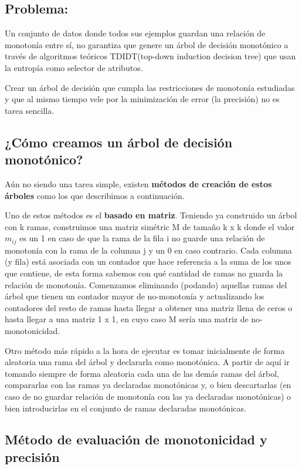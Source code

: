 \subsection{Problema:}
Un conjunto de datos donde todos sus ejemplos guardan una relación de monotonía entre sí, no garantiza que genere un árbol de decisión monotónico a través de algoritmos teóricos TDIDT(top-down induction decision tree) que usan la entropía como selector de atributos.

Crear un árbol de decisión que cumpla las restricciones de monotonía estudiadas y que al mismo tiempo vele por la minimización de error (la precisión) no es tarea sencilla. 

\subsection{¿Cómo creamos un árbol de decisión monotónico?}

Aún no siendo una tarea simple, existen \textbf{métodos de creación de estos árboles} como los que describimos a continuación.

Uno de estos métodos es el \textbf{basado en matriz}. Teniendo ya construido un árbol con k ramas, construimos una matriz simétric M de tamaño k x k donde el valor $m_{ij}$ es un 1 en caso de que la rama de la fila i no guarde una relación de monotonía con la rama de la columna j y un 0 en caso contrario. Cada columna (y fila) está asociada con un contador que hace referencia a la suma de los unos que contiene, de esta forma sabemos con qué cantidad de ramas no guarda la relación de monotonía. Comenzamos eliminando (podando) aquellas ramas del árbol que tienen un contador mayor de no-monotonía y actualizando los contadores del resto de ramas hasta llegar a obtener una matriz llena de ceros o hasta llegar a una matriz 1 x 1, en cuyo caso M sería una matriz de no-monotonicidad.

Otro método más rápido a la hora de ejecutar es tomar inicialmente de forma aleatoria una rama del árbol y declararla como monotónica. A partir de aquí ir tomando siempre de forma aleatoria cada una de las demás ramas del árbol, compararlas con las ramas ya declaradas monotónicas y, o bien descartarlas (en caso de no guardar relación de monotonía con las ya declaradas monotónicas) o bien introducirlas en el conjunto de ramas declaradas monotónicas.

\subsection{Método de evaluación de monotonicidad y precisión}

